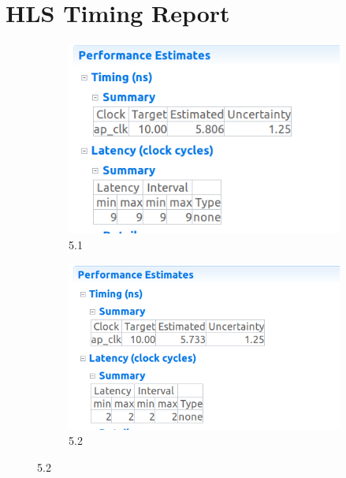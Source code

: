 \documentclass{article}
\begin{document}
\vspace{15cm}


\section{HLS Timing Report}
\vspace{1cm}
\begin{figure}[h]
\centering
\begin{subfigure}[b]{0.7\textwidth}
    \centering
\includegraphics[width=\textwidth]{figs/32a.png}
    \caption{5.1}
    \label{fig:my_label}
\end{subfigure}
\hfill
\begin{subfigure}[b]{0.8\textwidth}
    \centering
\includegraphics[width=\textwidth]{figs/32b.png}
    \caption{5.2}
    \label{fig:my_label}
\end{subfigure}
\end{figure}
\end{document}
